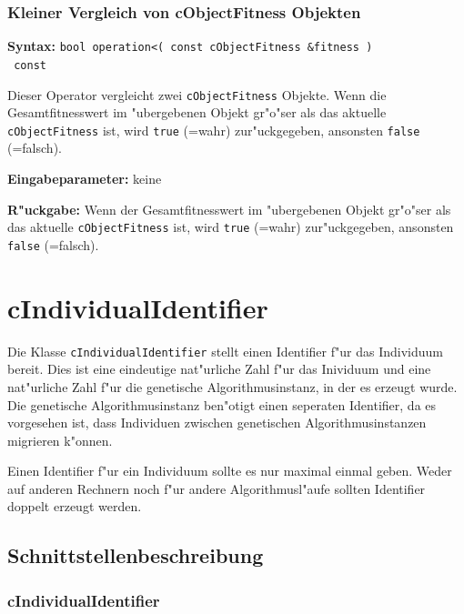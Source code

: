 \subsubsection{Kleiner Vergleich von cObjectFitness Objekten}

\textbf{Syntax:} \verb|bool operation<( const cObjectFitness &fitness )| \\\verb| const|

\bigskip\noindent
Dieser Operator vergleicht zwei \verb|cObjectFitness| Objekte. Wenn die Gesamtfitnesswert im "ubergebenen Objekt gr"o"ser als das aktuelle \verb|cObjectFitness| ist, wird \verb|true| (=wahr) zur"uckgegeben, ansonsten \verb|false| (=falsch).

\bigskip\noindent
\textbf{Eingabeparameter:} keine

\bigskip\noindent
\textbf{R"uckgabe:} Wenn der Gesamtfitnesswert im "ubergebenen Objekt gr"o"ser als das aktuelle \verb|cObjectFitness| ist, wird \verb|true| (=wahr) zur"uckgegeben, ansonsten \verb|false| (=falsch).




\section{cIndividualIdentifier}
\label{secCIndividuumIdentifier}

Die Klasse \verb|cIndividualIdentifier| stellt einen Identifier f"ur das Individuum bereit. Dies ist eine eindeutige nat"urliche Zahl f"ur das Inividuum und eine nat"urliche Zahl f"ur die genetische Algorithmusinstanz, in der es erzeugt wurde. Die genetische Algorithmusinstanz ben"otigt einen seperaten Identifier, da es vorgesehen ist, dass Individuen zwischen genetischen Algorithmusinstanzen migrieren k"onnen.

Einen Identifier f"ur ein Individuum sollte es nur maximal einmal geben. Weder auf anderen Rechnern noch f"ur andere Algorithmusl"aufe sollten Identifier doppelt erzeugt werden.


\subsection{Schnittstellenbeschreibung}

\subsubsection{cIndividualIdentifier}

